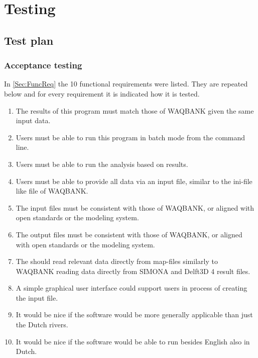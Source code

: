 \chapter{Testing} \label{Chp:Test}

\section{Test plan}

\subsection{Acceptance testing}

In \autoref{Sec:FuncReq} the 10 functional requirements were listed.
They are repeated below and for every requirement it is indicated how it is tested.

\begin{enumerate}
\item The results of this program must match those of WAQBANK given the same input data.
\item Users must be able to run this program in batch mode from the command line.
\item Users must be able to run the analysis based on \dflowfm results.
\item Users must be able to provide all data via an input file, similar to the ini-file like file of WAQBANK.
\item The input files must be consistent with those of WAQBANK, or aligned with open standards or the \dflowfm modeling system.
\item The output files must be consistent with those of WAQBANK, or aligned with open standards or the \dflowfm modeling system.

\item The should read relevant data directly from \dflowfm map-files similarly to WAQBANK reading data directly from SIMONA and Delft3D 4 result files.

\item A simple graphical user interface could support users in process of creating the input file.

\item It would be nice if the software would be more generally applicable than just the Dutch rivers.
\item It would be nice if the software would be able to run besides English also in Dutch.
\end{enumerate}

